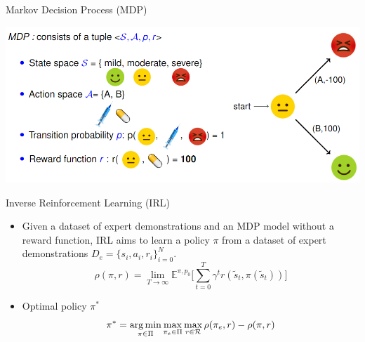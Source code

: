 
\begin{block}{Markov Decision Process (MDP)}
\vspace{0.15cm}
    \begin{center}
    \includegraphics[width=0.95\linewidth]{fig/mdp.png}    
  \end{center}
  \vspace{0.15cm}
\end{block}

\begin{block}{\normalsize{Inverse Reinforcement Learning (IRL)}}
  \begin{itemize}
     \item Given a dataset of expert demonstrations and an MDP model without a reward function, IRL aims to learn a policy $\pi$ 
       from a dataset of expert demonstrations $D_e = \{ s_i, a_i, r_i \}_{i=0}^{N}$.
     \[
       \rho(\pi, r) = \lim_{T \to \infty} \mathbb{E}^{\pi, p_0} \lbrack \sum_{t=0}^{T} \gamma^t r(\tilde{s}_t, \pi(\tilde{s}_t)) \rbrack
     \]
     \item Optimal policy $\pi^* $
     \[
       \pi^* = \operatorname*{arg\,min}_{\pi \in \Pi} \max_{\pi_e \in \Pi} \max_{r \in \mathcal{R}} \rho(\pi_e, r) - \rho(\pi, r)
     \]
    
\end{itemize}
\end{block}






